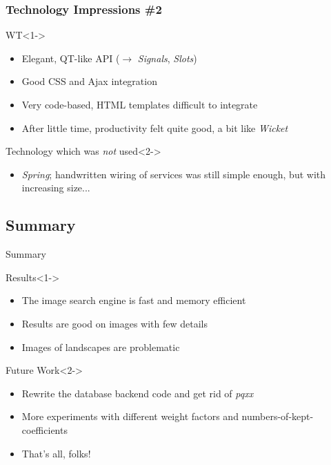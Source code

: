 \documentclass{beamer}
\newcommand\rarrow{$\longrightarrow$ } %
\begin{document}
\begin{frame}
  \frametitle{Technology Impressions \#2}

  \begin{block}{WT}<1->
    \begin{itemize}
    \item Elegant, QT-like API (\rarrow \emph{Signals}, \emph{Slots})
    \item Good CSS and Ajax integration
    \item Very code-based, HTML templates difficult to integrate
    \item After little time, productivity felt quite good, a bit like
      \emph{Wicket}
    \end{itemize}
  \end{block}
  \begin{block}{Technology which was \emph{not} used}<2->
    \begin{itemize}
    \item \emph{Spring}; handwritten wiring of services was
      still simple enough, but with increasing size...
    \end{itemize}
  \end{block}
  
\end{frame}

\subsection{Summary}

\begin{frame}{Summary}

  \begin{block}{Results}<1->
    \begin{itemize}
    \item The image search engine is fast and memory efficient
    \item Results are good on images with few details
    \item Images of landscapes are problematic
    \end{itemize}
  \end{block}
  
  \begin{block}{Future Work}<2->
    \begin{itemize}
    \item Rewrite the database backend code and get rid of \emph{pqxx}
    \item More experiments with different weight factors and
      numbers-of-kept-coefficients
    \end{itemize}
  \end{block}
  
  \begin{itemize}
  \item<3-> That's all, folks!
  \end{itemize}

\end{frame}
\end{document}
